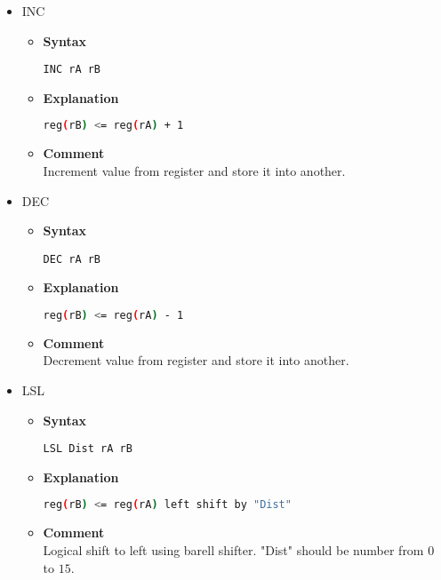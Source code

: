 \begin{itemize}
    \item INC
    \begin{itemize}
        \item \textbf{Syntax}
        \begin{lstlisting}[language={[x86masm]Assembler}, frame=single]
    INC rA rB
        \end{lstlisting}
        \item \textbf{Explanation}
        \begin{lstlisting}[language=bash, frame=single]
    reg(rB) <= reg(rA) + 1
        \end{lstlisting}
        \item \textbf{Comment} \\
    Increment value from register and store it into another.
    \end{itemize}

    \item DEC
    \begin{itemize}
        \item \textbf{Syntax}
        \begin{lstlisting}[language={[x86masm]Assembler}, frame=single]
    DEC rA rB
        \end{lstlisting}
        \item \textbf{Explanation}
        \begin{lstlisting}[language=bash, frame=single]
    reg(rB) <= reg(rA) - 1
        \end{lstlisting}
        \item \textbf{Comment} \\
    Decrement value from register and store it into another.
    \end{itemize}

    \item LSL
    \begin{itemize}
        \item \textbf{Syntax}
        \begin{lstlisting}[language={[x86masm]Assembler}, frame=single]
    LSL Dist rA rB
        \end{lstlisting}
        \item \textbf{Explanation}
        \begin{lstlisting}[language=bash, frame=single]
    reg(rB) <= reg(rA) left shift by "Dist"
        \end{lstlisting}
        \item \textbf{Comment} \\
    Logical shift to left using barell shifter. "Dist" should be number from $0$ to $15$.
    \end{itemize}


\end{itemize}
